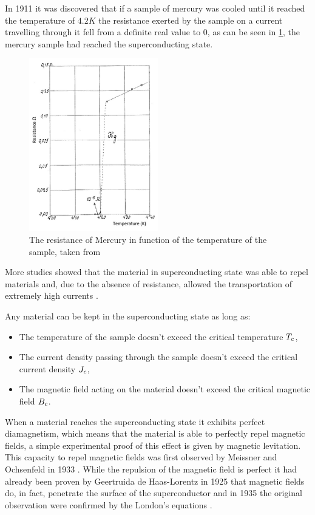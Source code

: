 In 1911 \cite{invention-superconductivity} it was discovered that if a sample of mercury was cooled
until it reached the temperature of $4.2K$ the resistance exerted by the sample on a current travelling
through it fell from a definite real value to $0$, as can be
seen in \ref{img:mercury-resistance}, the mercury sample had reached the superconducting state.
\begin{figure}
	\centering
	\includegraphics[width=0.5\textwidth]{./img/mercury-resistance.png}
	\caption{The resistance of Mercury in function of the temperature of the sample, taken from
		\cite{tsukerman2020compendium}}
	\label{img:mercury-resistance}
\end{figure}
More studies showed that the material in superconducting state was able to repel materials and, due
to the absence of resistance, allowed the transportation of extremely high currents
\cite{slimani2022superconducting}.

Any material can be kept in the superconducting state as long as:
\begin{itemize}
	\item The temperature of the sample doesn't exceed the critical temperature $T_c$,
	\item The current density passing through the sample doesn't exceed the critical current
	      density $J_c$,
	\item The magnetic field acting on the material doesn't exceed the critical magnetic field $B_c$.
\end{itemize}

When a material reaches the superconducting state it exhibits perfect diamagnetism, which means that
the material is able to perfectly repel magnetic fields, a simple experimental proof of this effect
is given by magnetic levitation. This capacity to repel magnetic fields was first observed by
Meissner and Ochsenfeld in 1933 \cite{meissner1933}. While the repulsion of the magnetic field is
perfect it had already been proven by Geertruida de Haas-Lorentz in 1925 \cite{fokker1925physica} that magnetic fields do, in fact, penetrate the surface of the superconductor and in 1935 the original observation were confirmed by the London's equations \cite{london1935}.

